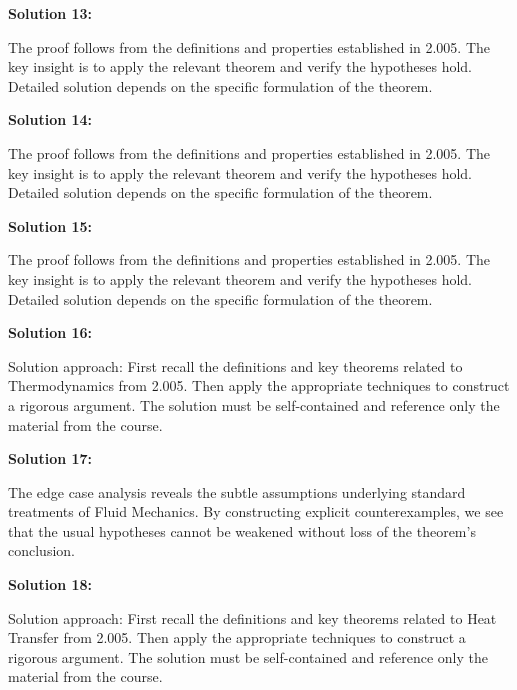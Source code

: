 \documentclass[12pt,a4paper]{exam}
\begin{document}
\vspace{0.5cm}

\textbf{Solution 13:}

The proof follows from the definitions and properties established in 2.005. The key insight is to apply the relevant theorem and verify the hypotheses hold. Detailed solution depends on the specific formulation of the theorem.

\vspace{0.5cm}

\textbf{Solution 14:}

The proof follows from the definitions and properties established in 2.005. The key insight is to apply the relevant theorem and verify the hypotheses hold. Detailed solution depends on the specific formulation of the theorem.

\vspace{0.5cm}

\textbf{Solution 15:}

The proof follows from the definitions and properties established in 2.005. The key insight is to apply the relevant theorem and verify the hypotheses hold. Detailed solution depends on the specific formulation of the theorem.

\vspace{0.5cm}

\textbf{Solution 16:}

Solution approach: First recall the definitions and key theorems related to Thermodynamics from 2.005. Then apply the appropriate techniques to construct a rigorous argument. The solution must be self-contained and reference only the material from the course.

\vspace{0.5cm}

\textbf{Solution 17:}

The edge case analysis reveals the subtle assumptions underlying standard treatments of Fluid Mechanics. By constructing explicit counterexamples, we see that the usual hypotheses cannot be weakened without loss of the theorem's conclusion.

\vspace{0.5cm}

\textbf{Solution 18:}

Solution approach: First recall the definitions and key theorems related to Heat Transfer from 2.005. Then apply the appropriate techniques to construct a rigorous argument. The solution must be self-contained and reference only the material from the course.
\end{document}
